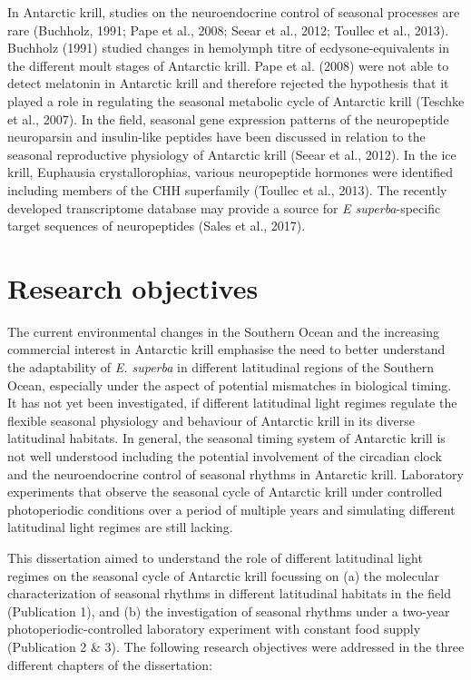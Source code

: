 In Antarctic krill, studies on the neuroendocrine control of seasonal processes
are rare (Buchholz, 1991; Pape et al., 2008; Seear et al., 2012; Toullec et
al., 2013). Buchholz (1991) studied changes in hemolymph titre of
ecdysone-equivalents in the different moult stages of Antarctic krill. Pape et
al. (2008) were not able to detect melatonin in Antarctic krill and therefore
rejected the hypothesis that it played a role in regulating the seasonal
metabolic cycle of Antarctic krill (Teschke et al., 2007).  In the field,
seasonal gene expression patterns of the neuropeptide neuroparsin and
insulin-like peptides have been discussed in relation to the seasonal
reproductive physiology of Antarctic krill (Seear et al., 2012). In the ice
krill, Euphausia crystallorophias, various neuropeptide hormones were
identified including members of the CHH superfamily (Toullec et al., 2013). The
recently developed transcriptome database may provide a source for \textit{E
superba}-specific target sequences of neuropeptides (Sales et al., 2017). 

\section{Research objectives}
The current environmental changes in the Southern Ocean and the increasing
commercial interest in Antarctic krill emphasise the need to better understand
the adaptability of \textit{E. superba} in different latitudinal regions of the
Southern Ocean, especially under the aspect of potential mismatches in
biological timing. It has not yet been investigated, if different latitudinal
light regimes regulate the flexible seasonal physiology and behaviour of
Antarctic krill in its diverse latitudinal habitats.  In general, the seasonal
timing system of Antarctic krill is not well understood including the potential
involvement of the circadian clock and the neuroendocrine control of seasonal
rhythms in Antarctic krill. Laboratory experiments that observe the seasonal
cycle of Antarctic krill under controlled photoperiodic conditions over a
period of multiple years and simulating different latitudinal light regimes are
still lacking.

This dissertation aimed to understand the role of different latitudinal light
regimes on the seasonal cycle of Antarctic krill focussing on (a) the molecular
characterization of seasonal rhythms in different latitudinal habitats in the
field (Publication 1), and (b) the investigation of seasonal rhythms under a
two-year photoperiodic-controlled laboratory experiment with constant food
supply (Publication 2 \& 3). The following research objectives were addressed
in the three different chapters of the dissertation:

